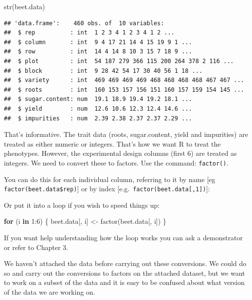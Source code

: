 \documentclass[
]{book}
\makeatletter
\newenvironment{Shaded}{\begin{snugshade}}{\end{snugshade}}
\newcommand{\ControlFlowTok}[1]{\textcolor[rgb]{0.13,0.29,0.53}{\textbf{#1}}}
\newcommand{\DecValTok}[1]{\textcolor[rgb]{0.00,0.00,0.81}{#1}}
\newcommand{\FunctionTok}[1]{\textcolor[rgb]{0.00,0.00,0.00}{#1}}
\newcommand{\NormalTok}[1]{#1}
\newcommand{\OtherTok}[1]{\textcolor[rgb]{0.56,0.35,0.01}{#1}}
\newcommand{\SpecialCharTok}[1]{\textcolor[rgb]{0.00,0.00,0.00}{#1}}
\newenvironment{kframe}{%
\medskip{}
\setlength{\fboxsep}{.8em}
 \def\at@end@of@kframe{}%
 \ifinner\ifhmode%
  \def\at@end@of@kframe{\end{minipage}}%
  \begin{minipage}{\columnwidth}%
 \fi\fi%
 \def\FrameCommand##1{\hskip\@totalleftmargin \hskip-\fboxsep
 \colorbox{shadecolor}{##1}\hskip-\fboxsep
     \hskip-\linewidth \hskip-\@totalleftmargin \hskip\columnwidth}%
 \MakeFramed {\advance\hsize-\width
   \@totalleftmargin\z@ \linewidth\hsize
   \@setminipage}}%
 {\par\unskip\endMakeFramed%
 \at@end@of@kframe}
\newenvironment{rmdblock}[1]
  {
  \begin{itemize}
  \renewcommand{\labelitemi}{
    \raisebox{-.7\height}[0pt][0pt]{
      {\setkeys{Gin}{width=3em,keepaspectratio}\texttt{[image: images/\#1]}}
    }
  }
  \setlength{\fboxsep}{1em}
  \begin{kframe}
  \item
  }
  {
  \end{kframe}
  \end{itemize}
  }
\newenvironment{rmdnote}
  {\begin{rmdblock}{note}}
  {\end{rmdblock}}
\makeatother
\begin{document}
\begin{Shaded}
\begin{Highlighting}[]
\FunctionTok{str}\NormalTok{(beet.data)}
\end{Highlighting}
\end{Shaded}

\begin{verbatim}
## 'data.frame':    460 obs. of  10 variables:
##  $ rep          : int  1 2 3 4 1 2 3 4 1 2 ...
##  $ column       : int  9 4 17 21 14 4 15 19 9 1 ...
##  $ row          : int  14 4 14 8 10 3 15 7 18 9 ...
##  $ plot         : int  54 187 279 366 115 200 264 378 2 116 ...
##  $ block        : int  9 28 42 54 17 30 40 56 1 18 ...
##  $ variety      : int  469 469 469 469 468 468 468 468 467 467 ...
##  $ roots        : int  160 153 157 156 151 160 157 159 154 145 ...
##  $ sugar.content: num  19.1 18.9 19.4 19.2 18.1 ...
##  $ yield        : num  12.6 10.6 12.3 12.4 14.6 ...
##  $ impurities   : num  2.39 2.38 2.37 2.37 2.29 ...
\end{verbatim}

That's informative. The trait data (roots, sugar.content, yield and impurities) are treated as either numeric or integers. That's how we want R to treat the phenotypes. However, the experimental design columns (first 6) are treated as integers. We need to convert these to factors. Use the command: \texttt{factor()}.

You can do this for each individual column, referring to it by name {[}eg \texttt{factor(beet.data\$rep)}{]} or by index {[}e.g.~\texttt{factor(beet.data{[},1{]})}{]}:

Or put it into a loop if you wish to speed things up:

\begin{Shaded}
\begin{Highlighting}[]
\ControlFlowTok{for}\NormalTok{ (i }\ControlFlowTok{in} \DecValTok{1}\SpecialCharTok{:}\DecValTok{6}\NormalTok{) \{}
\NormalTok{    beet.data[, i] }\OtherTok{\textless{}{-}} \FunctionTok{factor}\NormalTok{(beet.data[, i])}
\NormalTok{\}}
\end{Highlighting}
\end{Shaded}

If you want help understanding how the loop works you can ask a demonstrator or refer to Chapter 3.

\begin{rmdnote}
We haven't attached the data before carrying out these conversions. We could do so and carry out the conversions to factors on the attached dataset, but we want to work on a subset of the data and it is easy to be confused about what version of the data we are working on.
\end{rmdnote}
\end{document}
